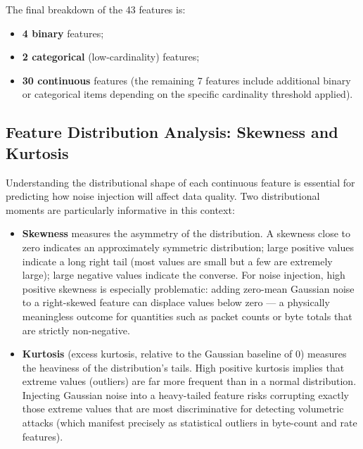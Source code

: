 The final breakdown of the 43 features is:
\begin{itemize}
  \item \textbf{4 binary} features;
  \item \textbf{2 categorical} (low-cardinality) features;
  \item \textbf{30 continuous} features (the remaining 7 features include
        additional binary or categorical items depending on the specific
        cardinality threshold applied).
\end{itemize}

\subsection{Feature Distribution Analysis: Skewness and Kurtosis}
\label{sec:skew-kurtosis}

Understanding the distributional shape of each continuous feature is essential
for predicting how noise injection will affect data quality.  Two distributional
moments are particularly informative in this context:

\begin{itemize}
  \item \textbf{Skewness} measures the asymmetry of the distribution.  A
        skewness close to zero indicates an approximately symmetric
        distribution; large positive values indicate a long right tail
        (most values are small but a few are extremely large); large negative
        values indicate the converse.  For noise injection, high positive
        skewness is especially problematic: adding zero-mean Gaussian noise
        to a right-skewed feature can displace values below zero — a physically
        meaningless outcome for quantities such as packet counts or byte totals
        that are strictly non-negative.
  \item \textbf{Kurtosis} (excess kurtosis, relative to the Gaussian baseline
        of 0) measures the heaviness of the distribution's tails.  High
        positive kurtosis implies that extreme values (outliers) are far more
        frequent than in a normal distribution.  Injecting Gaussian noise into
        a heavy-tailed feature risks corrupting exactly those extreme values
        that are most discriminative for detecting volumetric attacks (which
        manifest precisely as statistical outliers in byte-count and rate
        features).
\end{itemize}

